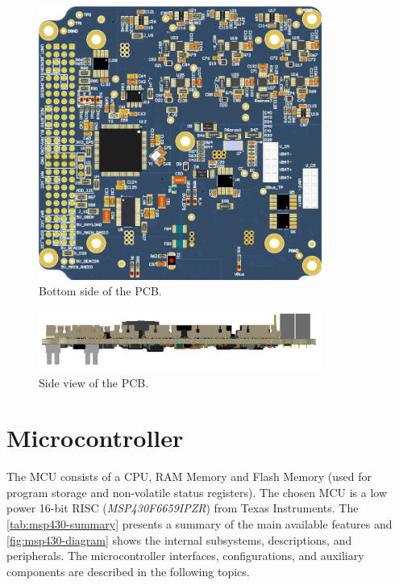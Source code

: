 \begin{figure}[!ht]
    \begin{center}
        \includegraphics[width=93mm]{figures/eps2-pcb-bottom.png}
        \caption{Bottom side of the PCB.}
        \label{fig:pcb-bottom}
    \end{center}
\end{figure}

\begin{figure}[!ht]
    \begin{center}
        \includegraphics[width=93mm]{figures/eps2-pcb-side.png}
        \caption{Side view of the PCB.}
        \label{fig:pcb-side}
    \end{center}
\end{figure}

\section{Microcontroller}

The MCU consists of a CPU, RAM Memory and Flash Memory (used for program storage and non-volatile status registers). The chosen MCU is a low power 16-bit RISC (\textit{MSP430F6659IPZR}) from Texas Instruments\cite{msp430f6659}. The \autoref{tab:msp430-summary} presents a summary of the main available features and \autoref{fig:msp430-diagram} shows the internal subsystems, descriptions, and peripherals. The microcontroller interfaces, configurations, and auxiliary components are described in the following topics.


